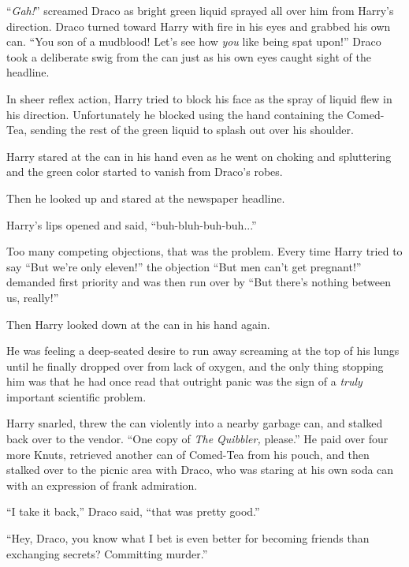 
“\emph{Gah!}” screamed Draco as bright green liquid sprayed all over him from Harry’s direction. Draco turned toward Harry with fire in his eyes and grabbed his own can. “You son of a mudblood! Let’s see how \emph{you} like being spat upon!” Draco took a deliberate swig from the can just as his own eyes caught sight of the headline.

In sheer reflex action, Harry tried to block his face as the spray of liquid flew in his direction. Unfortunately he blocked using the hand containing the Comed-Tea, sending the rest of the green liquid to splash out over his shoulder.

Harry stared at the can in his hand even as he went on choking and spluttering and the green color started to vanish from Draco’s robes.

Then he looked up and stared at the newspaper headline.


Harry’s lips opened and said, “buh-bluh-buh-buh...”

Too many competing objections, that was the problem. Every time Harry tried to say “But we’re only eleven!” the objection “But men can’t get pregnant!” demanded first priority and was then run over by “But there’s nothing between us, really!”

Then Harry looked down at the can in his hand again.

He was feeling a deep-seated desire to run away screaming at the top of his lungs until he finally dropped over from lack of oxygen, and the only thing stopping him was that he had once read that outright panic was the sign of a \emph{truly} important scientific problem.

Harry snarled, threw the can violently into a nearby garbage can, and stalked back over to the vendor. “One copy of \emph{The Quibbler,} please.” He paid over four more Knuts, retrieved another can of Comed-Tea from his pouch, and then stalked over to the picnic area with Draco, who was staring at his own soda can with an expression of frank admiration.

“I take it back,” Draco said, “that was pretty good.”

“Hey, Draco, you know what I bet is even better for becoming friends than exchanging secrets? Committing murder.”

